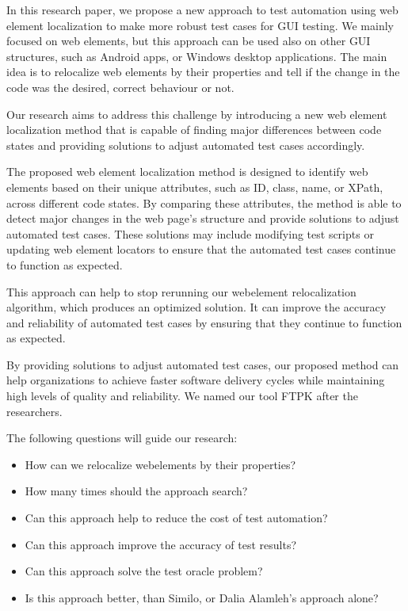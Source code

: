 \documentclass{article}
\begin{document}
In this research paper, we propose a new approach to test automation using web element localization to make more robust test cases for GUI testing. We mainly focused on web elements, but this approach can be used also on other GUI structures, such as Android apps, or Windows desktop applications. The main idea is to relocalize web elements by their properties and tell if the change in the code was the desired, correct behaviour or not. 

Our research aims to address this challenge by introducing a new web element localization method that is capable of finding major differences between code states and providing solutions to adjust automated test cases accordingly.

The proposed web element localization method is designed to identify web elements based on their unique attributes, such as ID, class, name, or XPath, across different code states. By comparing these attributes, the method is able to detect major changes in the web page's structure and provide solutions to adjust automated test cases. These solutions may include modifying test scripts or updating web element locators to ensure that the automated test cases continue to function as expected.

This approach can help to stop rerunning our webelement relocalization algorithm, which produces an optimized solution. It can improve the accuracy and reliability of automated test cases by ensuring that they continue to function as expected.

By providing solutions to adjust automated test cases, our proposed method can help organizations to achieve faster software delivery cycles while maintaining high levels of quality and reliability. We named our tool FTPK after the researchers.

The following questions will guide our research:

\begin{itemize}
\item How can we relocalize webelements by their properties?
\item How many times should the approach search?
\item Can this approach help to reduce the cost of test automation?
\item Can this approach improve the accuracy of test results?
\item Can this approach solve the test oracle problem?
\item Is this approach better, than Similo, or Dalia Alamleh's approach alone?
\end{itemize}
\end{document}

